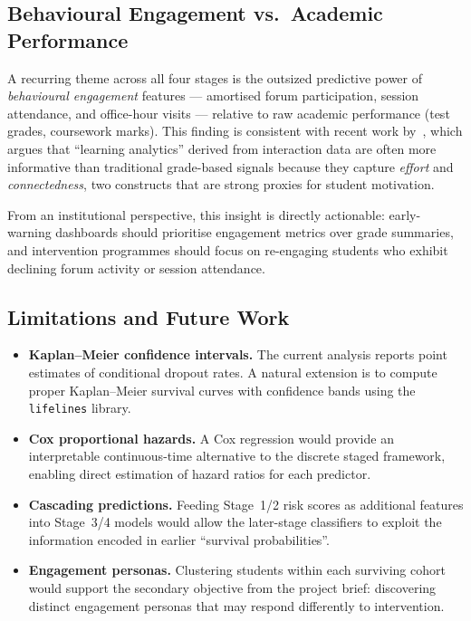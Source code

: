 \documentclass[8pt,twocolumn]{extarticle}
\begin{document}
\subsection{Behavioural Engagement vs.\ Academic Performance}

A recurring theme across all four stages is the outsized predictive power of
\emph{behavioural engagement} features --- amortised forum participation, session
attendance, and office-hour visits --- relative to raw academic performance
(test grades, coursework marks).
This finding is consistent with recent work by~\cite{baker2010data}, which argues
that ``learning analytics'' derived from interaction data are often more informative
than traditional grade-based signals because they capture \emph{effort} and
\emph{connectedness}, two constructs that are strong proxies for student motivation.

From an institutional perspective, this insight is directly actionable:
early-warning dashboards should prioritise engagement metrics over grade summaries,
and intervention programmes should focus on re-engaging students who exhibit declining
forum activity or session attendance.

\subsection{Limitations and Future Work}

\begin{itemize}
  \item \textbf{Kaplan--Meier confidence intervals.}
        The current analysis reports point estimates of conditional dropout rates.
        A natural extension is to compute proper Kaplan--Meier survival curves with
        confidence bands using the \texttt{lifelines} library.

  \item \textbf{Cox proportional hazards.}
        A Cox regression would provide an interpretable continuous-time alternative
        to the discrete staged framework, enabling direct estimation of hazard ratios
        for each predictor.

  \item \textbf{Cascading predictions.}
        Feeding Stage~1/2 risk scores as additional features into Stage~3/4 models
        would allow the later-stage classifiers to exploit the information encoded
        in earlier ``survival probabilities''.

  \item \textbf{Engagement personas.}
        Clustering students within each surviving cohort would support the secondary
        objective from the project brief: discovering distinct engagement personas
        that may respond differently to intervention.
\end{itemize}
\end{document}
